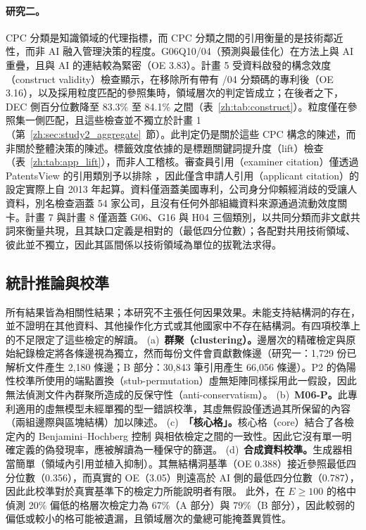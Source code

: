\paragraph{研究二。}CPC 分類是知識領域的代理指標，而 CPC 分類之間的引用衡量的是技術鄰近性，而非 AI 融入管理決策的程度。G06Q10/04（預測與最佳化）在方法上與 AI 重疊，且與 AI 的連結較為緊密（OE 3.83）。計畫 5 受資料啟發的構念效度（construct validity）檢查顯示，在移除所有帶有 /04 分類碼的專利後（OE 3.16），以及採用粒度匹配的參照集時，領域層次的判定皆成立；在後者之下，DEC 側百分位數降至 83.3\% 至 84.1\% 之間（表~\ref{zh:tab:construct}）。粒度僅在參照集一側匹配，且這些檢查並不獨立於計畫 1（第~\ref{zh:sec:study2_aggregate}~節）。此判定仍是關於這些 CPC 構念的陳述，而非關於整體決策的陳述。標籤效度依據的是標題關鍵詞提升度（lift）檢查（表~\ref{zh:tab:app_lift}），而非人工稽核。審查員引用（examiner citation）僅透過 PatentsView 的引用類別予以排除 \citep{alcacer2006patent,uspto2026patentsview}，因此僅含申請人引用（applicant citation）的設定實際上自 2013 年起算。資料僅涵蓋美國專利，公司身分仰賴經消歧的受讓人資料，別名檢查涵蓋 54 家公司，且沒有任何外部組織資料來源通過流動效度關卡。計畫 7 與計畫 8 僅涵蓋 G06、G16 與 H04 三個類別，以共同分類而非文獻共詞來衡量共現，且其缺口定義是相對的（最低四分位數）；各配對共用技術領域、彼此並不獨立，因此其區間係以技術領域為單位的拔靴法求得。

\subsection{統計推論與校準}
\label{zh:sec:lim_inference}

所有結果皆為相關性結果；本研究不主張任何因果效果。未能支持結構洞的存在，並不證明在其他資料、其他操作化方式或其他國家中不存在結構洞。有四項校準上的不足限定了這些檢定的解讀。
(a)~\textbf{群聚（clustering）。}邊層次的精確檢定與原始紀錄檢定將各條邊視為獨立，然而每份文件會貢獻數條邊（研究一：1,729 份已解析文件產生 2,180 條邊；B 部分：30,843 筆引用產生 66,056 條邊）。P2 的偽陽性校準所使用的端點置換（stub-permutation）虛無矩陣同樣採用此一假設，因此無法偵測文件內群聚所造成的反保守性（anti-conservatism）。
(b)~\textbf{M06-P。}此專利適用的虛無模型未經單獨的型一錯誤校準，其虛無假設僅透過其所保留的內容（兩組邊際與區塊結構）加以陳述。
(c)~\textbf{「核心格」。}核心格（core）結合了各檢定內的 Benjamini--Hochberg 控制 \citep{benjamini1995controlling} 與相依檢定之間的一致性。因此它沒有單一明確定義的偽發現率，應被解讀為一種保守的篩選。
(d)~\textbf{合成資料校準。}生成器相當簡單（領域內引用並植入抑制）。其無結構洞基準（OE 0.388）接近參照最低四分位數（0.356），而真實的 OE（3.05）則遠高於 AI 側的最低四分位數（0.787），因此此校準對於真實基準下的檢定力所能說明者有限。
此外，在 $E\geq100$ 的格中偵測 20\% 偏低的格層次檢定力為 67\%（A 部分）與 79\%（B 部分），因此較弱的偏低或較小的格可能被遺漏，且領域層次的彙總可能掩蓋異質性。

